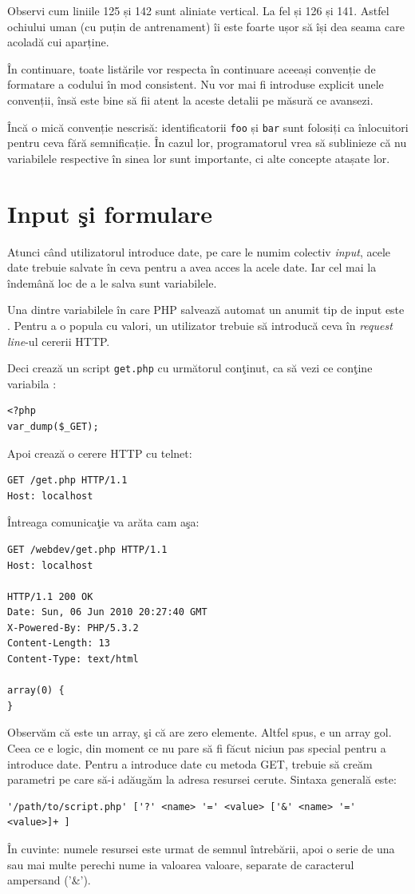 Observi cum liniile 125 și 142 sunt aliniate vertical. La fel și 126 și 141. Astfel ochiului uman (cu puțin de antrenament)
îi este foarte ușor să își dea seama care acoladă cui aparține.

În continuare, toate listările vor respecta în continuare aceeași convenție de formatare a codului
în mod consistent. Nu vor mai fi introduse explicit unele convenții, însă este bine să fii atent
la aceste detalii pe măsură ce avansezi.

Încă o mică convenție nescrisă: identificatorii \texttt{foo} și \texttt{bar} sunt folosiți ca înlocuitori
pentru ceva fără semnificație. În cazul lor, programatorul vrea să sublinieze că nu variabilele respective
în sinea lor sunt importante, ci alte concepte atașate lor.

\section{Input şi formulare}
Atunci când utilizatorul introduce date, pe care le numim colectiv \textsl{input},
acele date trebuie salvate în ceva pentru a avea acces la acele date. Iar cel
mai la îndemână loc de a le salva sunt variabilele.

Una dintre variabilele în care PHP salvează automat un anumit tip de input este \get.
Pentru a o popula cu valori, un utilizator trebuie să introducă ceva în \textsl{request line}-ul
cererii HTTP.

Deci crează un script \texttt{get.php} cu următorul conţinut, ca să vezi ce conţine variabila \get:
\begin{lstlisting}
<?php
var_dump($_GET);
\end{lstlisting}
Apoi crează o cerere HTTP cu telnet:
\begin{verbatim}
GET /get.php HTTP/1.1
Host: localhost

\end{verbatim}
Întreaga comunicaţie va arăta cam aşa:
\begin{verbatim}
GET /webdev/get.php HTTP/1.1
Host: localhost

HTTP/1.1 200 OK
Date: Sun, 06 Jun 2010 20:27:40 GMT
X-Powered-By: PHP/5.3.2
Content-Length: 13
Content-Type: text/html

array(0) {
}
\end{verbatim}
Observăm că {\get} este un array, şi că are zero elemente. Altfel spus,
e un array gol. Ceea ce e logic, din moment ce nu pare să fi făcut niciun
pas special pentru a introduce date. Pentru a introduce date cu metoda GET,
trebuie să creăm parametri pe care să-i adăugăm la adresa resursei cerute.
Sintaxa generală este:
\begin{verbatim}
'/path/to/script.php' ['?' <name> '=' <value> ['&' <name> '=' <value>]+ ]
\end{verbatim}
În cuvinte: numele resursei este urmat de semnul întrebării, apoi o serie de
una sau mai multe perechi nume {\glqq}ia valoarea{\grqq} valoare, separate de caracterul
ampersand ('\&').

